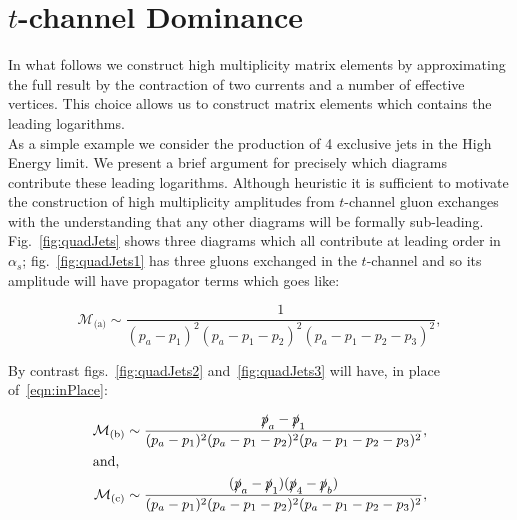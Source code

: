 \section{$t$-channel Dominance}
	\label{sec:tChannel}

	In what follows we construct high multiplicity matrix elements by approximating the full result
	by the contraction of two currents and a number of effective vertices.  This choice allows us
	to construct matrix elements which contains the leading logarithms.\\
	As a simple example we consider the production of 4 exclusive jets in the High Energy limit.
	We present a brief argument for precisely which diagrams contribute these leading logarithms.
	Although heuristic it is sufficient to motivate the construction of high multiplicity amplitudes from
	$t$-channel gluon exchanges with the understanding that any other diagrams will be formally sub-leading.
	Fig.~\eqref{fig:quadJets} shows three diagrams which all contribute at leading order in $\alpha_s$;
	fig.~\eqref{fig:quadJets1} has three gluons exchanged in the $t$-channel and so its amplitude will
	have propagator terms which goes like:

	\begin{equation}
		\mathcal{M}_{\text{(a)}}\sim\frac{1}{(p_a - p_1)^2(p_a - p_1 - p_2)^2(p_a - p_1 - p_2 - p_3)^2},
		\label{eqn:inPlace}
	\end{equation}

	By contrast figs.~\eqref{fig:quadJets2} and~\eqref{fig:quadJets3} will
	have, in place of~\eqref{eqn:inPlace}:

	\begin{align}
		\mathcal{M}_{\text{(b)}}\sim\frac{\slashed p_a - \slashed p_1}
		{(p_a - p_1)^2(p_a - p_1 - p_2)^2(p_a - p_1 - p_2 - p_3)^2},\\
		\intertext{and,}
		\mathcal{M}_{\text{(c)}}\sim\frac{(\slashed p_a - \slashed p_1)(\slashed p_4 - \slashed p_b)}
		{(p_a - p_1)^2(p_a - p_1 - p_2)^2(p_a - p_1 - p_2 - p_3)^2},
	\end{align}

